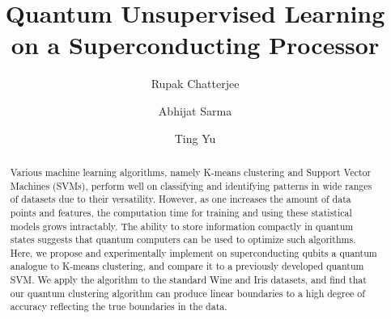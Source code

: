 \documentclass[twocolumn, english]{revtex4-2}
\begin{document}
\title{Quantum Unsupervised Learning on a Superconducting Processor}
\author{Rupak Chatterjee}
\author{Abhijat Sarma}
\author{Ting Yu}
\begin{abstract}
Various machine learning algorithms, namely K-means clustering and Support Vector Machines (SVMs), perform well on classifying and identifying patterns in wide ranges of datasets due to their versatility. However, as one increases the amount of data points and features, the computation time for training and using these statistical models grows intractably. The ability to store information compactly in quantum states suggests that quantum computers can be used to optimize such algorithms. Here, we propose and experimentally implement on superconducting qubits a quantum analogue to K-means clustering, and compare it to a previously developed quantum SVM. We apply the algorithm to the standard Wine and Iris datasets, and find that our quantum clustering algorithm can produce linear boundaries to a high degree of accuracy reflecting the true boundaries in the data.
\end{abstract}
\maketitle
\end{document}
